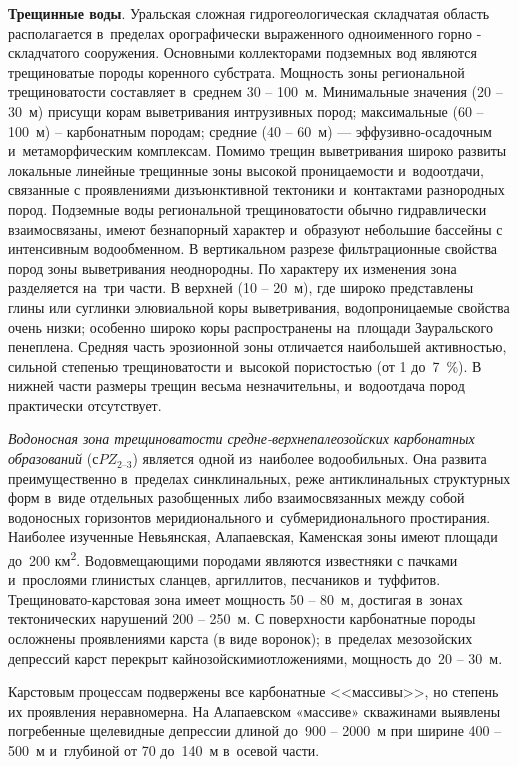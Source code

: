 \textbf{Трещинные воды}. Уральская сложная гидрогеологическая складчатая область располагается в~пределах орографически выраженного одноименного горно - складчатого сооружения. Основными коллекторами подземных вод являются трещиноватые породы коренного субстрата. Мощность зоны региональной трещиноватости составляет в~среднем 30  --  100~м. Минимальные значения (20  --  30~м) присущи корам выветривания интрузивных пород; максимальные (60  --  100~м)  --  карбонатным породам; средние (40  --  60~м)  ---  эффузивно-осадочным и~метаморфическим комплексам. Помимо трещин выветривания широко развиты локальные линейные трещинные зоны высокой проницаемости и~водоотдачи, связанные с проявлениями дизъюнктивной тектоники и~контактами разнородных пород. Подземные воды региональной трещиноватости обычно гидравлически взаимосвязаны, имеют безнапорный характер и~образуют небольшие бассейны с интенсивным
водообменном. В вертикальном разрезе фильтрационные свойства пород зоны выветривания неоднородны. По характеру их изменения зона разделяется на~три части. В верхней (10  --  20~м), где широко представлены глины или суглинки элювиальной коры выветривания, водопроницаемые свойства очень низки; особенно широко коры распространены на~площади Зауральского пенеплена. Средняя часть эрозионной зоны отличается наибольшей активностью, сильной степенью трещиноватости и~высокой пористостью (от 1 до~7~\%). В нижней части размеры трещин весьма незначительны, и~водоотдача пород практически отсутствует.

\textit{Водоносная зона трещиноватости средне-верхнепалеозойских карбонатных образований} ($сPZ_{2–3}$) является одной из~наиболее водообильных. Она развита преимущественно в~пределах синклинальных, реже антиклинальных структурных форм в~виде отдельных разобщенных либо взаимосвязанных между собой водоносных горизонтов меридионального и~субмеридионального простирания. Наиболее изученные Невьянская, Алапаевская,
Каменская зоны имеют площади до~200 км\textsuperscript{2}. Водовмещающими породами являются известняки с пачками и~прослоями глинистых сланцев, аргиллитов, песчаников и~туффитов. Трещиновато-карстовая зона имеет мощность 50  --  80~м, достигая в~зонах тектонических нарушений 200  --  250~м. С поверхности карбонатные породы осложнены проявлениями карста (в виде воронок); в~пределах мезозойских депрессий карст перекрыт кайнозойскимиотложениями, мощность до~20  --  30~м.

Карстовым процессам подвержены все карбонатные <<массивы>>, но степень их проявления неравномерна. На Алапаевском «массиве» скважинами выявлены погребенные щелевидные депрессии длиной до~900  --  2000~м
при ширине 400  --  500~м и~глубиной от 70 до~140~м в~осевой части.

